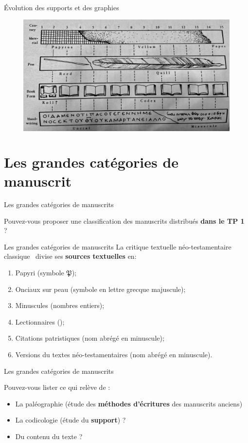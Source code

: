 \documentclass[11pt]{beamer}
\begin{document}
\begin{frame}{Évolution des supports et des graphies}
\begin{figure}
    \centering
    \includegraphics[width=0.5\linewidth]{evolution.png}
\end{figure}
\end{frame}

\section{Les grandes catégories de manuscrit}

\begin{frame}{Les grandes catégories de manuscrits}
\begin{block}{}
    Pouvez-vous proposer une classification des manuscrits distribués \textbf{dans le TP 1 }?
\end{block}
\end{frame}

\begin{frame}{Les grandes catégories de manuscrits}
    La critique textuelle néo-testamentaire \og classique \fg\ divise ses \textbf{sources textuelles} en:
    \begin{enumerate}
        \item Papyri (symbole $\mathfrak{P}$);
        \item Onciaux sur peau (symbole en lettre grecque majuscule);
        \item Minuscules (nombres entiers);
        \item Lectionnaires ();
        \item Citations patristiques (nom abrégé en minuscule);
        \item Versions du textes néo-testamentaires (nom abrégé en minuscule).
    \end{enumerate}
\end{frame}


\begin{frame}{Les grandes catégories de manuscrits}
    \begin{alertblock}{}
        Pouvez-vous lister ce qui relève de : 
        \begin{itemize}
            \item La paléographie (étude des \textbf{méthodes d'écritures} des manuscrits anciens)
            \item La codicologie (étude du \textbf{support}) ?
            \item Du contenu du texte ?
        \end{itemize}
    \end{alertblock}
\end{frame}
\end{document}
